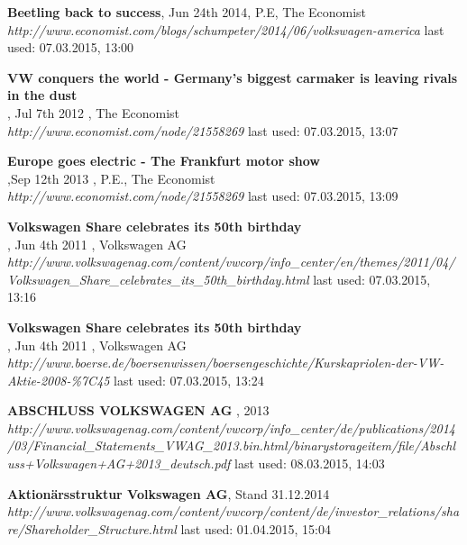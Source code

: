 \documentclass[12pt]{article}
\begin{document}
\begin{thebibliography}{56}

  \textbf{Beetling back to success}, Jun 24th 2014, P.E, The Economist\\
  \textit{http://www.economist.com/blogs/schumpeter/2014/06/volkswagen-america}
  \newline last used: 07.03.2015, 13:00
  
   
  \textbf{VW conquers the world - Germany’s biggest carmaker is leaving rivals in the dust}\\, Jul 7th 2012 , The Economist\\
  \textit{  http://www.economist.com/node/21558269}
  \newline last used: 07.03.2015, 13:07
  
    
   
  \textbf{Europe goes electric - The Frankfurt motor show
}\\,Sep 12th 2013 , P.E., The Economist\\
  \textit{  http://www.economist.com/node/21558269}
  \newline last used: 07.03.2015, 13:09
  
  \textbf{Volkswagen Share celebrates its 50th birthday}\\, Jun 4th 2011 , Volkswagen AG\\
  \textit{http://www.volkswagenag.com/content/vwcorp/info\_center/en/themes/2011/04/Volkswagen\_Share\_celebrates\_its\_50th\_birthday.html
}
  \newline last used: 07.03.2015, 13:16
  
  \textbf{Volkswagen Share celebrates its 50th birthday}\\, Jun 4th 2011 , Volkswagen AG\\
  \textit{  http://www.boerse.de/boersenwissen/boersengeschichte/Kurskapriolen-der-VW-Aktie-2008-\%7C45}
  \newline last used: 07.03.2015, 13:24
  

  \textbf{ABSCHLUSS VOLKSWAGEN AG }, 2013 \\
  \textit{ http://www.volkswagenag.com/content/vwcorp/info\_center/de/publications/2014/03/Financial\_Statements\_VWAG\_2013.bin.html/binarystorageitem/file/Abschluss+Volkswagen+AG+2013\_deutsch.pdf  
}
  \newline last used: 08.03.2015, 14:03
    
    
  \textbf{Aktionärsstruktur Volkswagen AG}, Stand 31.12.2014 \\
  \textit{http://www.volkswagenag.com/content/vwcorp/content/de/investor\_relations/share/Shareholder\_Structure.html}
  \newline last used: 01.04.2015, 15:04
    

\end{thebibliography}
\end{document}
